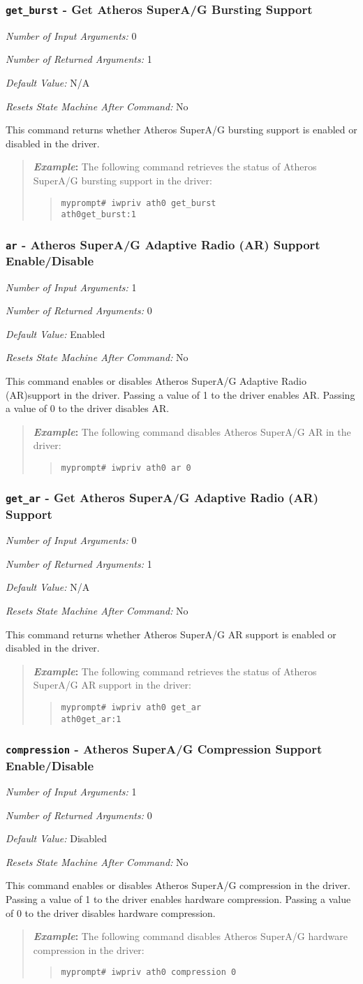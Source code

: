 \documentclass[10pt,fullpage]{article}
\newcommand{\mytt}[1]{{\texttt{#1}}}
\newcommand{\bv}{\begin{verse}}
\newcommand{\ev}{\end{verse}}
\newcommand{\cmd}[1]{{\texttt{myprompt\# #1}}}
\newcommand{\argdesc}[4]{\begin{description}
\itemsep -6pt
\item \textit{Number of Input Arguments:} #1
\item \textit{Number of Returned Arguments:} #2
\item \textit{Default Value:} #3
\item \textit{Resets State Machine After Command:} #4
\end{description}
}
\newenvironment{example}{\begin{quote}\textbf{\textit{Example}:}}{\end{quote}}
\begin{document}
\subsubsection{\mytt{get\_burst} - Get Atheros SuperA/G Bursting
  Support}
\argdesc{0}{1}{N/A}{No}
This command returns whether Atheros SuperA/G bursting support is enabled or disabled
in the driver.
\begin{example}
The following command retrieves the status of Atheros SuperA/G bursting support in
the driver:
\bv
\cmd{iwpriv ath0 get\_burst}\\
\mytt{ath0\hspace{32pt}get\_burst:1}
\ev
\end{example}

\subsubsection{\mytt{ar} - Atheros SuperA/G Adaptive Radio (AR) Support Enable/Disable}
\argdesc{1}{0}{Enabled}{No}
This command enables or disables Atheros SuperA/G Adaptive Radio
(AR)support in the driver.  Passing a value of 1 to the driver enables
AR. Passing a value of 0 to the driver disables AR.
\begin{example}
The following command disables Atheros SuperA/G AR in the driver:
\bv
\cmd{iwpriv ath0 ar 0}
\ev
\end{example}

\subsubsection{\mytt{get\_ar} - Get Atheros SuperA/G Adaptive Radio
  (AR) Support}
\argdesc{0}{1}{N/A}{No}
This command returns whether Atheros SuperA/G AR support is enabled or disabled
in the driver.
\begin{example}
The following command retrieves the status of Atheros SuperA/G AR support in
the driver:
\bv
\cmd{iwpriv ath0 get\_ar}\\
\mytt{ath0\hspace{32pt}get\_ar:1}
\ev
\end{example}

\subsubsection{\mytt{compression} - Atheros SuperA/G Compression Support Enable/Disable}
\argdesc{1}{0}{Disabled}{No}
This command enables or disables Atheros SuperA/G compression in the
driver.  Passing a value of 1 to the driver enables hardware
compression. Passing a value of 0 to the driver disables hardware
compression.
\begin{example}
The following command disables Atheros SuperA/G hardware compression in the driver:
\bv
\cmd{iwpriv ath0 compression 0}
\ev
\end{example}
\end{document}
